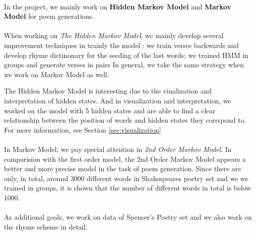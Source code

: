 \paragraph{}
In the project, we mainly work on \textbf{Hidden Markov Model} and \textbf{Markov Model} for poem generations. 
\paragraph{}
When working on \textit{The Hidden Markov Model}, we mainly develop several improvement techniques in trainly the model : we train verses backwards and develop rhyme dictinonary for the seeding of the last words; we trained HMM in groups and generate verses in pairs In general, we take the same strategy when we work on Markov Model as well.

The Hidden Markov Model is interesting due to the viualization and interpretation of hidden states. And in visualization and interpretation, we worked on the model with 5 hidden states and are able to find a clear relationship between the position of words and hidden states they corrspond to. For more information, see Section \ref{sec:visualization}

\paragraph{}
In Markov Model, we pay special attention in \textit{2nd Order Markov Model}. In comparision with the first order model, the 2nd Order Markov Model appears a better and more precise model in the task of poem generation. Since there are only, in total, around 3000 different words in Shakespeares poetry set and we we trained in groups, it is shown that the number of different words in total is below 1000.

\paragraph{}
As additional goals, we work on data of Spenser's Poetry set and we also work on the rhyme scheme in detail.